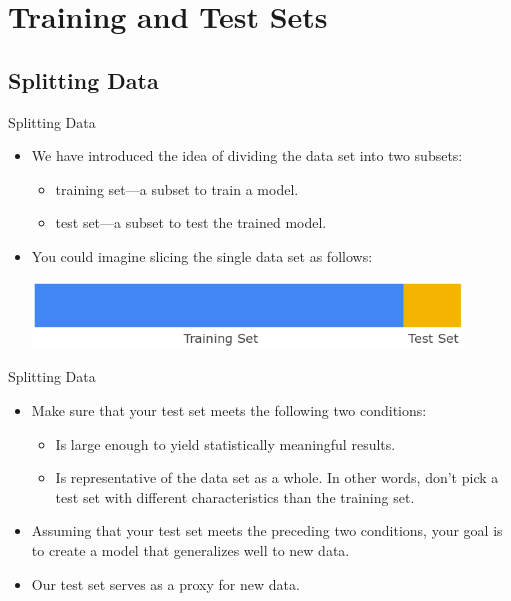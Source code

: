 \documentclass{beamer}
\begin{document}

\section{Training and Test Sets}

\subsection{Splitting Data}

\begin{frame}{Splitting Data}
\begin{itemize}
    \item We have introduced the idea of dividing the data set into two subsets:

\medskip
    \begin{itemize}
        \item training set—a subset to train a model.

\medskip
        \item test set—a subset to test the trained model.
    \end{itemize}

\medskip
    \item You could imagine slicing the single data set as follows:
    
    \medskip
    \includegraphics[width=0.9\textwidth]{images/PartitionTwoSets.png}
\end{itemize}
\end{frame}


\begin{frame}{Splitting Data}
\begin{itemize}
\item Make sure that your test set meets the following two conditions:

\medskip
\begin{itemize}
\item Is large enough to yield statistically meaningful results.

\medskip
\item Is representative of the data set as a whole. In other words, don't pick a test set with different characteristics than the training set.
\end{itemize}

\medskip
\item Assuming that your test set meets the preceding two conditions, your goal is to create a model that generalizes well to new data. 
    
\medskip
\item
Our test set serves as a proxy for new data. 
\end{itemize}
\end{frame}
\end{document}
